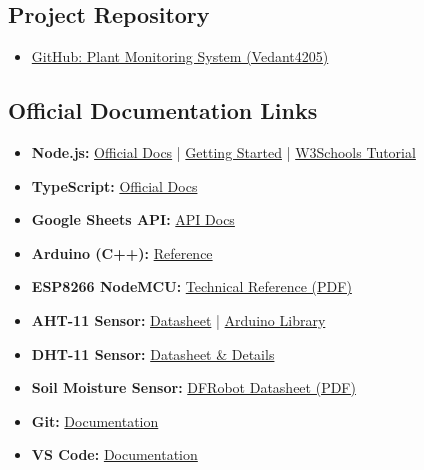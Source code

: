 \documentclass[12pt,a4paper]{article}
\begin{document}
\subsection*{Project Repository}
\begin{itemize}[leftmargin=*,nosep]
    \item \href{https://github.com/Vedant4205/Plant-Monitoring-System}{GitHub: Plant Monitoring System (Vedant4205)}
\end{itemize}

\subsection*{Official Documentation Links}
\begin{itemize}[leftmargin=*,nosep]
    \item \textbf{Node.js:} \href{https://nodejs.org/api/all.html}{Official Docs} | \href{https://nodejs.org/en/learn/getting-started/introduction-to-nodejs}{Getting Started} | \href{https://www.w3schools.com/nodejs/}{W3Schools Tutorial}
    \item \textbf{TypeScript:} \href{https://www.typescriptlang.org}{Official Docs}
    \item \textbf{Google Sheets API:} \href{https://developers.google.com/sheets/api}{API Docs}
    \item \textbf{Arduino (C++):} \href{https://www.arduino.cc/reference/en/}{Reference}
    \item \textbf{ESP8266 NodeMCU:} \href{https://www.espressif.com/sites/default/files/documentation/esp8266-technical_reference_en.pdf}{Technical Reference (PDF)}
    \item \textbf{AHT-11 Sensor:} \href{https://www.adafruit.com/product/4566}{Datasheet} | \href{https://github.com/adafruit/Adafruit_AHTX0}{Arduino Library}
    \item \textbf{DHT-11 Sensor:} \href{https://components101.com/sensors/dht11-temperature-sensor}{Datasheet \& Details}
    \item \textbf{Soil Moisture Sensor:} \href{https://media.digikey.com/pdf/data%20sheets/dfrobot%20pdfs/sen0193_web.pdf}{DFRobot Datasheet (PDF)}
    \item \textbf{Git:} \href{https://git-scm.com/doc}{Documentation}
    \item \textbf{VS Code:} \href{https://code.visualstudio.com/docs}{Documentation}
\end{itemize}
\end{document}
